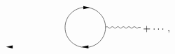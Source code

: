 \[\begin{gathered}
\begin{tikzpicture}[x=0.75pt,y=0.75pt,yscale=-0.75,xscale=0.75]
            \draw [shift={(233.26,210.34)}, rotate = 360] [fill={rgb, 255:red, 0; green, 0; blue, 0 }  ][line width=0.08]  [draw opacity=0] (12,-3) -- (0,0) -- (12,3) -- cycle    ;
            \draw   (340.71,174.48) .. controls (340.71,154.13) and (357.21,137.63) .. (377.56,137.63) .. controls (397.91,137.63) and (414.41,154.13) .. (414.41,174.48) .. controls (414.41,194.84) and (397.91,211.34) .. (377.56,211.34) .. controls (357.21,211.34) and (340.71,194.84) .. (340.71,174.48) -- cycle ;
            \draw    (414.41,174.48) .. controls (416.08,172.81) and (417.74,172.81) .. (419.41,174.48) .. controls (421.08,176.15) and (422.74,176.15) .. (424.41,174.48) .. controls (426.08,172.81) and (427.74,172.81) .. (429.41,174.48) .. controls (431.08,176.15) and (432.74,176.15) .. (434.41,174.48) .. controls (436.08,172.81) and (437.74,172.81) .. (439.41,174.48) .. controls (441.08,176.15) and (442.74,176.15) .. (444.41,174.48) .. controls (446.08,172.81) and (447.74,172.81) .. (449.41,174.48) .. controls (451.08,176.15) and (452.74,176.15) .. (454.41,174.48) .. controls (456.08,172.81) and (457.74,172.81) .. (459.41,174.48) .. controls (461.08,176.15) and (462.74,176.15) .. (464.41,174.48) .. controls (466.08,172.81) and (467.74,172.81) .. (469.41,174.48) .. controls (471.08,176.15) and (472.74,176.15) .. (474.41,174.48) -- (478.41,174.48) -- (478.41,174.48) ;
            \draw    (386,138) ;
            \draw [shift={(386,138)}, rotate = 180] [fill={rgb, 255:red, 0; green, 0; blue, 0 }  ][line width=0.08]  [draw opacity=0] (12,-3) -- (0,0) -- (12,3) -- cycle    ;
            \draw    (378.56,210.34) -- (373.26,210.34) ;
            \draw [shift={(371.26,210.34)}, rotate = 360] [fill={rgb, 255:red, 0; green, 0; blue, 0 }  ][line width=0.08]  [draw opacity=0] (12,-3) -- (0,0) -- (12,3) -- cycle    ;
            \end{tikzpicture}                
    \end{gathered} + \cdots,
\]